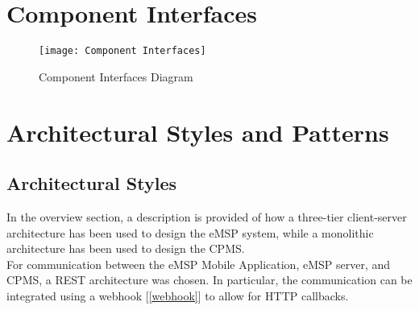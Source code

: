 \section{Component Interfaces} %
\label{sec:componentInterfaces}
\begin{figure}[H]
            \begin{center}
            \texttt{[image: Component Interfaces]}
            \caption{Component Interfaces Diagram}
            \label{fig:ComponentInterfaces}
            \end{center}
        \end{figure}
\section{Architectural Styles and Patterns} %
\label{sec:artchitecturalStylesPatterns}
\subsection{Architectural Styles}
In the overview section, a description is provided of how a three-tier client-server architecture has been used to design the eMSP system, while a monolithic architecture has been used to design the CPMS. \\
For communication between the eMSP Mobile Application, eMSP server, and CPMS, a REST architecture was chosen. In particular, the communication can be integrated using a webhook [\ref{webhook}] to allow for HTTP callbacks.
\label{subsec:architecturalStyles}
